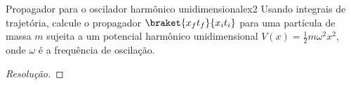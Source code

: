 \begin{exercício}{Propagador para o oscilador harmônico unidimensional}{ex2}
   Usando integrais de trajetória, calcule o propagador \(\braket{x_f t_f}{x_i t_i}\) para uma partícula de massa \(m\) sujeita a um potencial harmônico unidimensional \(V(x) = \frac12 m \omega^2 x^2\), onde \(\omega\) é a frequência de oscilação.
\end{exercício}
\begin{proof}[Resolução]
    
\end{proof}
